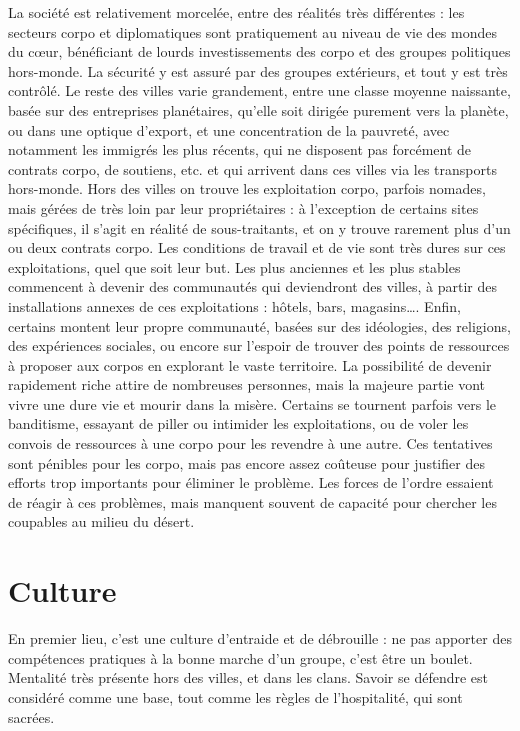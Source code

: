 \documentclass[10pt,a4paper]{book}
\begin{document}
\begin{multicols}{2}
La société est relativement morcelée, entre des réalités très différentes : les secteurs corpo et diplomatiques sont pratiquement au niveau de vie des mondes du cœur, bénéficiant de lourds investissements des corpo et des groupes politiques hors-monde. La sécurité y est assuré par des groupes extérieurs, et tout y est très contrôlé. Le reste des villes varie grandement, entre une classe moyenne naissante, basée sur des entreprises planétaires, qu'elle soit dirigée purement vers la planète, ou dans une optique d'export, et une concentration de la pauvreté, avec notamment les immigrés les plus récents, qui ne disposent pas forcément de contrats corpo, de soutiens, etc. et qui arrivent dans ces villes via les transports hors-monde. Hors des villes on trouve les exploitation corpo, parfois nomades, mais gérées de très loin par leur propriétaires : à l'exception de certains sites spécifiques, il s'agit en réalité de sous-traitants, et on y trouve rarement plus d'un ou deux contrats corpo. Les conditions de travail et de vie sont très dures sur ces exploitations, quel que soit leur but. Les plus anciennes et les plus stables commencent à devenir des communautés qui deviendront des villes, à partir des installations annexes de ces exploitations : hôtels, bars, magasins…. Enfin, certains montent leur propre communauté, basées sur des idéologies, des religions, des expériences sociales, ou encore sur l'espoir de trouver des points de ressources à proposer aux corpos en explorant le vaste territoire. La possibilité de devenir rapidement riche attire de nombreuses personnes, mais la majeure partie vont vivre une dure vie et mourir dans la misère. Certains se tournent parfois vers le banditisme, essayant de piller ou intimider les exploitations, ou de voler les convois de ressources à une corpo pour les revendre à une autre. Ces tentatives sont pénibles pour les corpo, mais pas encore assez coûteuse pour justifier des efforts trop importants pour éliminer le problème. Les forces de l'ordre essaient de réagir à ces problèmes, mais manquent souvent de capacité pour chercher les coupables au milieu du désert.

\section{Culture}
En premier lieu, c'est une culture d'entraide et de débrouille : ne pas apporter des compétences pratiques à la bonne marche d'un groupe, c'est être un boulet. Mentalité très présente hors des villes, et dans les clans. Savoir se défendre est considéré comme une base, tout comme les règles de l'hospitalité, qui sont sacrées. 



\end{multicols}
\end{document}
